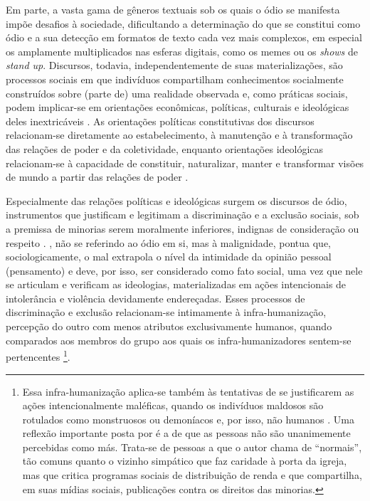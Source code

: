 \documentclass[portuguese]{textolivre}
\begin{document}
Em parte, a vasta gama de gêneros textuais sob os quais o ódio se manifesta impõe desafios à sociedade, dificultando a determinação do que se constitui como ódio e a sua detecção em formatos de texto cada vez mais complexos, em especial os amplamente multiplicados nas esferas digitais, como os memes ou os \emph{shows} de \emph{stand up}. Discursos, todavia, independentemente de suas materializações, são processos sociais em que indivíduos compartilham conhecimentos socialmente construídos sobre (parte de) uma realidade observada \cite{kress2001multimodal} e, como práticas sociais, podem implicar-se em orientações econômicas, políticas, culturais e ideológicas deles inextricáveis \cite{fairclough2001}. As orientações políticas constitutivas dos discursos relacionam-se diretamente ao estabelecimento, à manutenção e à transformação das relações de poder e da coletividade, enquanto orientações ideológicas relacionam-se à capacidade de constituir, naturalizar, manter e transformar visões de mundo a partir das relações de poder \cite{fairclough2001}.

Especialmente das relações políticas e ideológicas surgem os discursos de ódio, instrumentos que justificam e legitimam a discriminação e a exclusão sociais, sob a premissa de minorias serem moralmente inferiores, indignas de consideração ou respeito \cite{brown2017hate}. \textcite{cattani2020}, não se referindo ao ódio em si, mas à malignidade, pontua que, sociologicamente, o mal extrapola o nível da intimidade da opinião pessoal (pensamento) e deve, por isso, ser considerado como fato social, uma vez que nele se articulam e verificam as ideologias, materializadas em ações intencionais de intolerância e violência devidamente endereçadas. Esses processos de discriminação e exclusão relacionam-se intimamente à infra-humanização, percepção do outro com menos atributos exclusivamente humanos, quando comparados aos membros do grupo aos quais os infra-humanizadores sentem-se pertencentes \cite{haslam2014dehumanization}\footnote{Essa infra-humanização aplica-se também às tentativas de se justificarem as ações intencionalmente maléficas, quando os indivíduos maldosos são rotulados como monstruosos ou demoníacos e, por isso, não humanos \cite{cattani2020}. Uma reflexão importante posta por \textcite{cattani2020} é a de que as pessoas não são unanimemente percebidas como más. Trata-se de pessoas a que o autor chama de “normais”, tão comuns quanto o vizinho simpático que faz caridade à porta da igreja, mas que critica programas sociais de distribuição de renda e que compartilha, em suas mídias sociais, publicações contra os direitos das minorias.}.
\end{document}
